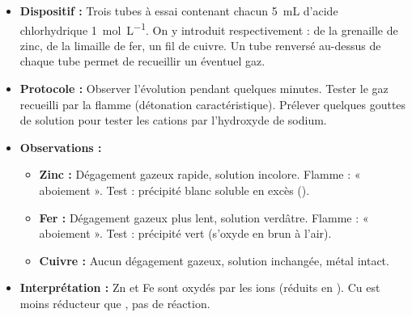 \documentclass[11pt]{article}
\begin{document}
\begin{experience}
\begin{itemize}
\item \textbf{Dispositif :} Trois tubes à essai contenant chacun \SI{5}{mL} d'acide chlorhydrique \SI{1}{mol.L^{-1}}. On y introduit respectivement : de la grenaille de zinc, de la limaille de fer, un fil de cuivre. Un tube renversé au-dessus de chaque tube permet de recueillir un éventuel gaz.
\item \textbf{Protocole :} Observer l'évolution pendant quelques minutes. Tester le gaz recueilli par la flamme (détonation caractéristique). Prélever quelques gouttes de solution pour tester les cations par l'hydroxyde de sodium.
\item \textbf{Observations :}
\begin{itemize}
\item \textbf{Zinc :} Dégagement gazeux rapide, solution incolore. Flamme : « aboiement ». Test  : précipité blanc soluble en excès ().
\item \textbf{Fer :} Dégagement gazeux plus lent, solution verdâtre. Flamme : « aboiement ». Test  : précipité vert  (s'oxyde en brun à l'air).
\item \textbf{Cuivre :} Aucun dégagement gazeux, solution inchangée, métal intact.
\end{itemize}
\item \textbf{Interprétation :} Zn et Fe sont oxydés par les ions  (réduits en ). Cu est moins réducteur que , pas de réaction.
\end{itemize}
\end{experience}
\end{document}
